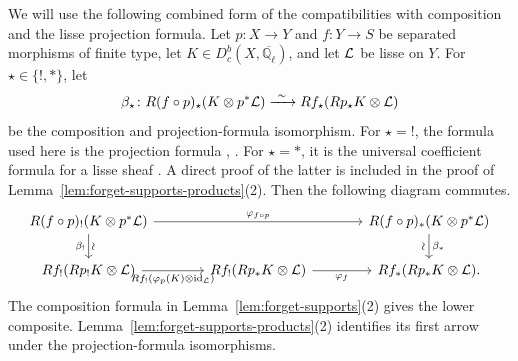 \documentclass[12pt,reqno]{amsart}
\theoremstyle{definition}
\theoremstyle{plain}
\theoremstyle{definition}
\theoremstyle{remark}
\newcommand{\bbQ}{\mathbb{Q}}  \newcommand{\bbR}{\mathbb{R}}
\newcommand{\ol}[1]{\overline{#1}}
\newcommand{\Ql}{\bbQ_{\ell}}
\newcommand{\Db}{D^b_c}
\begin{document}
We will use the following combined form of the compatibilities with composition and the lisse projection
formula.  Let \(p\colon X\to Y\) and \(f\colon Y\to S\) be separated morphisms of finite type, let
\(K\in\Db(X,\ol\Ql)\), and let \(\mathcal{L}\) be lisse on \(Y\).  For \(\star\in\{!,*\}\), let
\[
 \beta_\star\colon
 R(f\circ p)_\star(K\otimes p^*\mathcal{L})
 \xrightarrow{\ \sim\ }
 Rf_\star(Rp_\star K\otimes\mathcal{L})
\]
be the composition and projection-formula isomorphism.
For \(\star=!\), the formula used here is the projection formula
\cite[Exp.~XVII, Prop.~5.2.9]{SGA4}, \cite[Prop.~A.1.5(ii)]{GabberLoeser1996}.  For \(\star=*\), it is
the universal coefficient formula for a lisse sheaf \cite[Prop.~A.1.5(i)]{GabberLoeser1996}.  A direct
proof of the latter is included in the proof of Lemma~\ref{lem:forget-supports-products}(2).
Then the following diagram commutes.
\begin{equation}
\label{eq:forget-supports-composition-lisse}
\begin{tikzcd}[column sep=large]
R(f\circ p)_!(K\otimes p^*\cL)
  \arrow[rr,"\varphi_{f\circ p}"]
  \arrow[d,"\beta_!"',"\rotatebox{90}{\(\sim\)}"]
&&
R(f\circ p)_*(K\otimes p^*\cL)
  \arrow[d,"\beta_*","\rotatebox{90}{\(\sim\)}"'] \\
Rf_!(Rp_!K\otimes\cL)
  \arrow[r,"Rf_!(\varphi_p(K)\otimes\operatorname{id}_{\cL})"']
&
Rf_!(Rp_*K\otimes\cL)
  \arrow[r,"\varphi_f"']
&
Rf_*(Rp_*K\otimes\cL).
\end{tikzcd}
\end{equation}
The composition formula in Lemma~\ref{lem:forget-supports}(2) gives the lower composite.  Lemma~\ref{lem:forget-supports-products}(2)
identifies its first arrow under the projection-formula isomorphisms.
\end{document}
